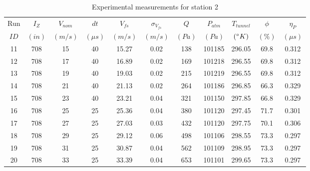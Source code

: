 \begin{table}[H]
\begin{center}
\begin{tabular}{|ccccccccccc|}
	\hline
	Run & $I_Z$ & $V_{nom}$ & $dt$ & $V_{fs}$ & $\sigma_{V_{fs}}$ & $Q$ & $P_{atm}$ & $T_{tunnel}$ & $\phi$ & $\eta_P$\\
	$ID$ & $(in)$ & $(m/s)$ & $(\mu s)$ & $(m/s)$ & $(m/s)$ & $(Pa)$ & $(Pa)$ & $(\degree K)$ & $(\%)$ & $(\mu s)$\\
	\hline
	11 & 708 & 15 & 40 & 15.27 & 0.02 & 138 & 101185 & 296.05 & 69.8 & 0.312\\
	12 & 708 & 17 & 40 & 16.89 & 0.02 & 169 & 101218 & 296.55 & 69.8 & 0.312\\
	13 & 708 & 19 & 40 & 19.03 & 0.02 & 215 & 101219 & 296.55 & 69.8 & 0.312\\
	14 & 708 & 21 & 40 & 21.13 & 0.02 & 264 & 101186 & 296.85 & 66.3 & 0.329\\
	15 & 708 & 23 & 40 & 23.21 & 0.04 & 321 & 101150 & 297.85 & 66.8 & 0.329\\
	16 & 708 & 25 & 25 & 25.36 & 0.04 & 380 & 101120 & 297.45 & 71.7 & 0.301\\
	17 & 708 & 27 & 25 & 27.03 & 0.03 & 432 & 101120 & 297.75 & 70.1 & 0.306\\
	18 & 708 & 29 & 25 & 29.12 & 0.06 & 498 & 101106 & 298.55 & 73.3 & 0.297\\
	19 & 708 & 31 & 25 & 30.87 & 0.04 & 562 & 101109 & 298.95 & 73.3 & 0.297\\
	20 & 708 & 33 & 25 & 33.39 & 0.04 & 653 & 101101 & 299.65 & 73.3 & 0.297\\
	\hline
\end{tabular}
\caption{Experimental measurements for station 2}
\label{table:station_2_measurements}
\end{center}
\end{table}
